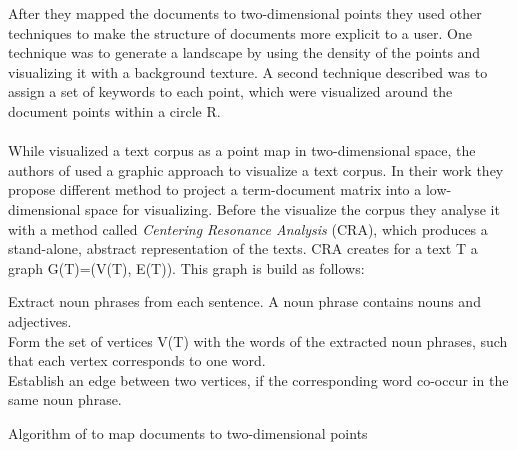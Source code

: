 After they mapped the documents to two-dimensional points they used other techniques to make the structure of documents more explicit to a user. One technique was to generate a landscape by using the density of the points and visualizing it with a  background texture. A second technique described was to assign a set of keywords to each point, which were visualized around the document points within a circle R. \\
~\\


While \cite{visualiuationCorpus1} visualized a text corpus as a point map in two-dimensional space,  the authors of \cite{visualiuationCorpus2} used a graphic approach to visualize a text corpus. In their work they propose different method to project a term-document matrix into a low-dimensional space for visualizing. Before the visualize the corpus they analyse it with a method called \textit{Centering Resonance Analysis} (CRA), which produces a stand-alone, abstract representation of the texts. CRA creates for a text T a graph G(T)=(V(T), E(T)). This graph is build as follows:
\begin{algorithm}
	
	     Extract noun phrases from each sentence. A noun phrase contains nouns and adjectives.  \\
		 Form the set of vertices V(T) with the words of the extracted noun phrases, such that each vertex corresponds to one word. \\ 
		 Establish an edge between two vertices, if the corresponding word co-occur in the same noun phrase.
	
	\caption{Algorithm of \cite{visualiuationCorpus1} to map documents to two-dimensional points}
\end{algorithm}


